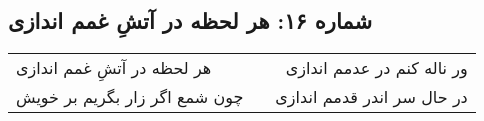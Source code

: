 \begin{center}
\section*{شماره ۱۶: هر لحظه در آتشِ غمم اندازی}
\label{sec:016}
\begin{longtable}{l p{0.5cm} r}
هر لحظه در آتشِ غمم اندازی
&&
ور ناله کنم در عدمم اندازی
\\
چون شمع اگر زار بگریم بر خویش
&&
در حال سر اندر قدمم اندازی
\\
\end{longtable}
\end{center}
